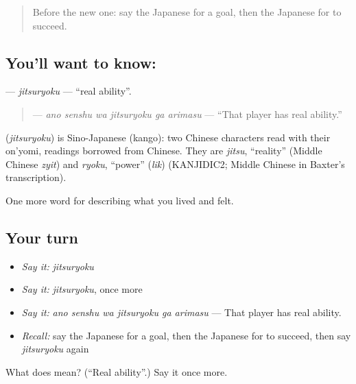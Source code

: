 \begin{quote}
Before the new one: say the Japanese for a goal, then the Japanese for to succeed.
\end{quote}

\subsection*{You'll want to know: }
\textbf{} — \emph{jitsuryoku} — \textquotedblleft{}real ability\textquotedblright{}.

\begin{quote}
\textbf{   } — \emph{ano senshu wa jitsuryoku ga arimasu} — \textquotedblleft{}That player has real ability.\textquotedblright{}
\end{quote}

\begin{cousinweb}
\textbf{} (\emph{jitsuryoku}) is Sino-Japanese (kango): two Chinese characters read with their on'yomi, readings borrowed from Chinese. They are \emph{jitsu}, \textquotedblleft{}reality\textquotedblright{} (Middle Chinese \emph{zyit}) and \emph{ryoku}, \textquotedblleft{}power\textquotedblright{} (\emph{lik}) (KANJIDIC2; Middle Chinese in Baxter's transcription).
\end{cousinweb}

\begin{grammarlens}[title={What you've built}]
One more word for describing what you lived and felt.
\end{grammarlens}

\subsection*{Your turn}
\begin{itemize}
\raggedright
  \item \emph{Say it:} \emph{jitsuryoku}
  \item \emph{Say it:} \emph{jitsuryoku}, once more
  \item \emph{Say it:} \emph{ano senshu wa jitsuryoku ga arimasu} — That player has real ability.
  \item \emph{Recall:} say the Japanese for a goal, then the Japanese for to succeed, then say \emph{jitsuryoku} again
\end{itemize}

\begin{tcolorbox}[breakable,colback=teal!4,colframe=teal!35!black,title={Before you move on}]
What does  mean? (\textquotedblleft{}Real ability\textquotedblright{}.) Say it once more.
\end{tcolorbox}
